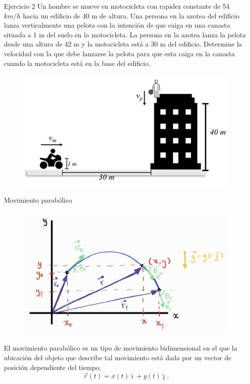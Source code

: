 \begin{frame}{Ejercicio 2}
    Un hombre se mueve en  motocicleta con rapidez 
constante de 54 $\unit{km}/\unit{h}$ hacia un 
edificio de 40 m de altura. Una 
persona en la azotea del edificio 
lanza verticalmente una pelota con 
la intención de que caiga en una 
canasta situada a 1 m del suelo en 
la motocicleta. La persona en la 
azotea lanza la pelota desde una 
altura de 42 m y la motocicleta está 
a 30 m del edificio. Determine la velocidad con la que debe lanzarse la pelota para que esta caiga en 
la canasta cuando la motocicleta está en la base del edificio.

\begin{figure}
    \centering
    \includegraphics[width=0.7\linewidth]{figures/moto-edificio.png}
\end{figure}

\end{frame}

\begin{frame}{Movimiento parabólico}
\begin{figure}
    \centering
    \includegraphics[width=0.7\linewidth]{figures/Parabolico.jpg}
\end{figure}
    El movimiento parabólico es un tipo de movimiento bidimensional en el que la ubicación del objeto que describe tal movimiento está dada por un vector de posición dependiente del tiempo, $$\vec{r}(t)=x(t)\hat{\imath}+y(t)\hat{\jmath}.$$
\end{frame}

